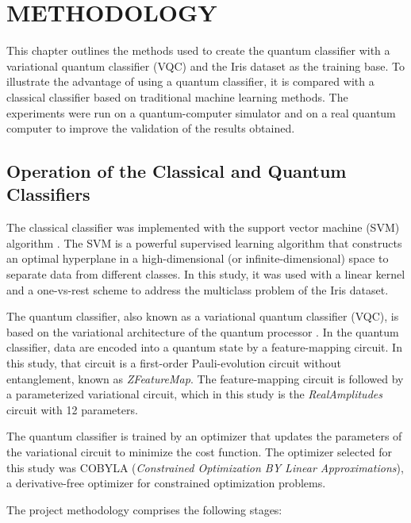 \chapter{METHODOLOGY} \label{chap_metodologia}

This chapter outlines the methods used to create the quantum classifier with a variational quantum classifier (VQC) and the Iris dataset as the training base. To illustrate the advantage of using a quantum classifier, it is compared with a classical classifier based on traditional machine learning methods. The experiments were run on a quantum-computer simulator and on a real quantum computer to improve the validation of the results obtained.

\section{Operation of the Classical and Quantum Classifiers}

The classical classifier was implemented with the support vector machine (SVM) algorithm \cite{Zhou2018HandwrittenDigitRecognition}. The SVM is a powerful supervised learning algorithm that constructs an optimal hyperplane in a high-dimensional (or infinite-dimensional) space to separate data from different classes. In this study, it was used with a linear kernel and a one-vs-rest scheme to address the multiclass problem of the Iris dataset.

The quantum classifier, also known as a variational quantum classifier (VQC), is based on the variational architecture of the quantum processor \cite{Havlicek2019qSupervisedLearning}. In the quantum classifier, data are encoded into a quantum state by a feature-mapping circuit. In this study, that circuit is a first-order Pauli-evolution circuit without entanglement, known as \textit{ZFeatureMap}. The feature-mapping circuit is followed by a parameterized variational circuit, which in this study is the \textit{RealAmplitudes} circuit with 12 parameters.

The quantum classifier is trained by an optimizer that updates the parameters of the variational circuit to minimize the cost function. The optimizer selected for this study was COBYLA (\textit{Constrained Optimization BY Linear Approximations}), a derivative-free optimizer for constrained optimization problems.

The project methodology comprises the following stages:

